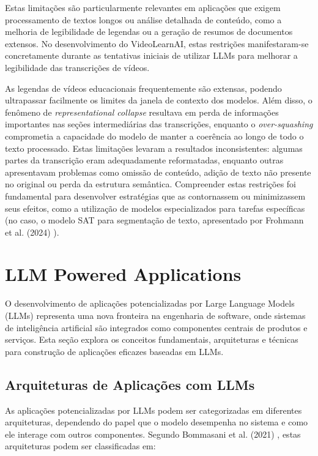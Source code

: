 \documentclass[tcc,capa]{texufpel}
\begin{document}
Estas limitações são particularmente relevantes em aplicações que exigem processamento de textos longos ou análise detalhada de conteúdo, como a melhoria de legibilidade de legendas ou a geração de resumos de documentos extensos. No desenvolvimento do VideoLearnAI, estas restrições manifestaram-se concretamente durante as tentativas iniciais de utilizar LLMs para melhorar a legibilidade das transcrições de vídeos. 

As legendas de vídeos educacionais frequentemente são extensas, podendo ultrapassar facilmente os limites da janela de contexto dos modelos. Além disso, o fenômeno de \textit{representational collapse} resultava em perda de informações importantes nas seções intermediárias das transcrições, enquanto o \textit{over-squashing} comprometia a capacidade do modelo de manter a coerência ao longo de todo o texto processado. Estas limitações levaram a resultados inconsistentes: algumas partes da transcrição eram adequadamente reformatadas, enquanto outras apresentavam problemas como omissão de conteúdo, adição de texto não presente no original ou perda da estrutura semântica. Compreender estas restrições foi fundamental para desenvolver estratégias que as contornassem ou minimizassem seus efeitos, como a utilização de modelos especializados para tarefas específicas (no caso, o modelo SAT para segmentação de texto, apresentado por Frohmann et al. (2024) \cite{frohmann2024segment}). 




\section{LLM Powered Applications}

O desenvolvimento de aplicações potencializadas por Large Language Models (LLMs) representa uma nova fronteira na engenharia de software, onde sistemas de inteligência artificial são integrados como componentes centrais de produtos e serviços. Esta seção explora os conceitos fundamentais, arquiteturas e técnicas para construção de aplicações eficazes baseadas em LLMs.

\subsection{Arquiteturas de Aplicações com LLMs}

As aplicações potencializadas por LLMs podem ser categorizadas em diferentes arquiteturas, dependendo do papel que o modelo desempenha no sistema e como ele interage com outros componentes. Segundo Bommasani et al. (2021) \cite{bommasani2021opportunities}, estas arquiteturas podem ser classificadas em:
\end{document}
